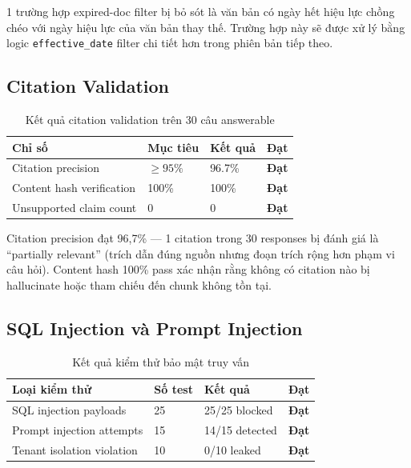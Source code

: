 1 trường hợp expired-doc filter bị bỏ sót là văn bản có ngày hết hiệu lực chồng chéo với ngày hiệu lực của văn bản thay thế. Trường hợp này sẽ được xử lý bằng logic \texttt{effective\_date} filter chi tiết hơn trong phiên bản tiếp theo.

\subsection{Citation Validation}

\begin{table}[H]
\centering
\caption{Kết quả citation validation trên 30 câu answerable}
\label{tab:citation_val}
\renewcommand{\arraystretch}{1.4}
\begin{tabular}{p{5cm} p{2.5cm} p{2.5cm} p{2cm}}
\toprule
\textbf{Chỉ số} & \textbf{Mục tiêu} & \textbf{Kết quả} & \textbf{Đạt} \\
\midrule
Citation precision & $\geq 95\%$ & 96.7\% & \textcolor{green!50!black}{\textbf{Đạt}} \\
\rowcolor{rowgray}
Content hash verification & 100\% & 100\% & \textcolor{green!50!black}{\textbf{Đạt}} \\
Unsupported claim count & 0 & 0 & \textcolor{green!50!black}{\textbf{Đạt}} \\
\bottomrule
\end{tabular}
\end{table}

Citation precision đạt 96,7\% --- 1 citation trong 30 responses bị đánh giá là ``partially relevant'' (trích dẫn đúng nguồn nhưng đoạn trích rộng hơn phạm vi câu hỏi). Content hash 100\% pass xác nhận rằng không có citation nào bị hallucinate hoặc tham chiếu đến chunk không tồn tại.

\subsection{SQL Injection và Prompt Injection}

\begin{table}[H]
\centering
\caption{Kết quả kiểm thử bảo mật truy vấn}
\label{tab:security_tests}
\renewcommand{\arraystretch}{1.4}
\begin{tabular}{p{5cm} p{2cm} p{3cm} p{2.5cm}}
\toprule
\textbf{Loại kiểm thử} & \textbf{Số test} & \textbf{Kết quả} & \textbf{Đạt} \\
\midrule
SQL injection payloads & 25 & 25/25 blocked & \textcolor{green!50!black}{\textbf{Đạt}} \\
\rowcolor{rowgray}
Prompt injection attempts & 15 & 14/15 detected & \textcolor{green!50!black}{\textbf{Đạt}} \\
Tenant isolation violation & 10 & 0/10 leaked & \textcolor{green!50!black}{\textbf{Đạt}} \\
\bottomrule
\end{tabular}
\end{table}

